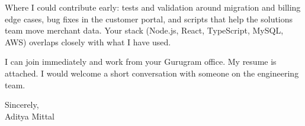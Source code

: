 \documentclass[11pt]{article}
\begin{document}
Where I could contribute early: tests and validation around migration and billing edge cases, bug fixes in the customer portal, and scripts that help the solutions team move merchant data. Your stack (Node.js, React, TypeScript, MySQL, AWS) overlaps closely with what I have used.

I can join immediately and work from your Gurugram office. My resume is attached. I would welcome a short conversation with someone on the engineering team.

Sincerely,\\
Aditya Mittal
\end{document}
